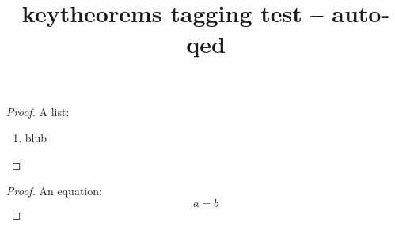 \documentclass{article}
\title{keytheorems tagging test -- auto-qed}
\begin{document}
\begin{proof}
A list:
\begin{enumerate}
\item blub
\end{enumerate}
\end{proof}

\begin{proof}
An equation:
\[ a=b \]
\end{proof}
\end{document}

